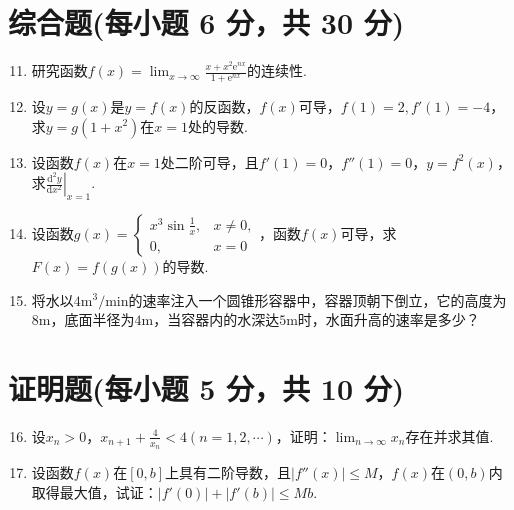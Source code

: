 \documentclass[../Main.tex]{subfiles}
\begin{document}
\section{综合题(每小题 6 分，共 30 分)}
\begin{enumerate}
    \setcounter{enumi}{10}
    \item 研究函数$f(x)=\lim_{x\to\infty}\frac{x+x^{2}\mathrm{e}^{nx}}{1+\mathrm{e}^{nx}}$的连续性.
          \vspace{10em}

    \item 设$y=g(x)$是$y=f(x)$的反函数，$f(x)$可导，$f(1)=2,f'(1)=-4$，求$y=
              g(1+x^{2})$在$x=1$处的导数.
          \vspace{10em}

    \item 设函数$f(x)$在$x=1$处二阶可导，且$f'(1)=0$，$f''(1)=0$，$y=f^{2}(x
              )$，求$\left.\frac{\mathrm{d}^{2} y}{\mathrm{d}x^{2}}\right|_{x=1}$.
          \vspace{8em}

    \item 设函数$g(x)=
              \begin{cases}
                  x^{3}\sin\frac{1}{x}, & x\neq0, \\
                  0,                    & x=0
              \end{cases}$，函数$f(x)$可导，求$F(x)=f(g(x))$的导数.
          \vspace{10em}

    \item 将水以$4\mathrm{m}^{3}/\mathrm{min}$的速率注入一个圆锥形容器中，容器顶朝下倒立，它的高度为$8
              \mathrm{m}$，底面半径为$4\mathrm{m}$，当容器内的水深达$5\mathrm{m}$时，水面升高的速率是多少？
          \vspace{12em}
\end{enumerate}

\section{证明题(每小题 5 分，共 10 分)}
\begin{enumerate}
    \setcounter{enumi}{15}
    \item 设$x_{n}>0$，$x_{n+1}+\frac{4}{x_{n}}<4(n=1,2,\cdots)$，证明：$\lim
              _{n\to\infty}x_{n}$存在并求其值.
          \vspace{12em}

    \item 设函数$f(x)$在$[0,b]$上具有二阶导数，且$|f''(x)|\leq M$，$f(x)$在$(
              0,b)$内取得最大值，试证：$|f'(0)|+|f'(b)|\leq Mb$.
          \vspace{10em}
\end{enumerate}
\end{document}
